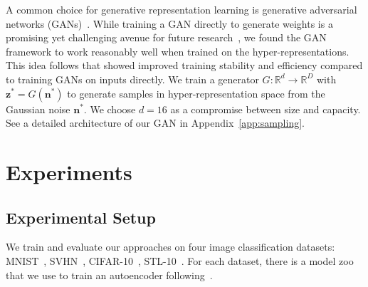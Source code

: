 \documentclass{article}
\begin{document}
A common choice for generative representation learning is generative adversarial networks (GANs)~\citep{goodfellowGenerativeAdversarialNets2014}. While training a GAN directly to generate weights is a promising yet challenging avenue for future research~\citep{ratzlaffHyperGANGenerativeModel2019}, we found the GAN framework to work reasonably well when trained on the hyper-representations. This idea follows \citep{liu2019acceleration,guo2019auto} that showed improved training stability and efficiency compared to training GANs on inputs directly.
We train a generator $G: \mathbb{R}^d \to \mathbb{R}^D$ with $\mathbf{z}^* = G(\mathbf{n}^*)$ to generate samples in hyper-representation space from the Gaussian noise $\mathbf{n}^*$.  We choose $d=16$ as a compromise between size and capacity.
See a detailed architecture of our GAN in Appendix~\ref{app:sampling}.
%

%
\section{Experiments}
\label{sec:experiments}
%
\vspace{-0.15cm}
\subsection{Experimental Setup}

We train and evaluate our approaches on four image classification datasets: MNIST~\citep{lecunGradientbasedLearningApplied1998}, SVHN~\citep{netzerReadingDigitsNatural2011}, 
CIFAR-10~\citep{krizhevskyLearningMultipleLayers2009}, STL-10~\citep{coatesAnalysisSingleLayerNetworks2011}. For each dataset, there is a model zoo that we use to train an autoencoder following~\citep{schurholtSelfSupervisedRepresentationLearning2021}.
\end{document}
